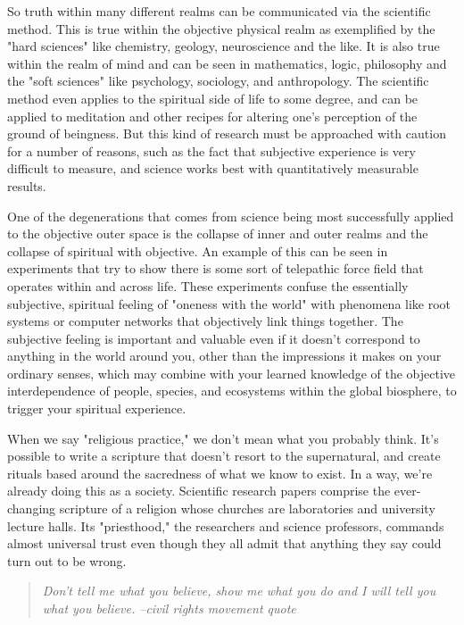 \documentclass[ebook,12pt,openany,twoside]{memoir}
\begin{document}
So truth within many different realms can be communicated via the scientific
method. This is true within the objective physical realm as exemplified by the
"hard sciences" like chemistry, geology, neuroscience and the like. It is also
true within the realm of mind and can be seen in mathematics, logic, philosophy
and the "soft sciences" like psychology, sociology, and anthropology. The
scientific method even applies to the spiritual side of life to some degree,
and can be applied to meditation and other recipes for altering one's
perception of the ground of beingness. But this kind of research must be
approached with caution for a number of reasons, such as the fact that
subjective experience is very difficult to measure, and science works best with
quantitatively measurable results.

One of the degenerations that comes from science being most successfully
applied to the objective outer space is the collapse of inner and outer realms
and the collapse of spiritual with objective. An example of this can be seen in
experiments that try to show there is some sort of telepathic force field that
operates within and across life. These experiments confuse the essentially
subjective, spiritual feeling of "oneness with the world" with phenomena like
root systems or computer networks that objectively link things together. The
subjective feeling is important and valuable even if it doesn't correspond to
anything in the world around you, other than the impressions it makes on your
ordinary senses, which may combine with your learned knowledge of the objective
interdependence of people, species, and ecosystems within the global biosphere,
to trigger your spiritual experience.

When we say "religious practice," we don't mean what you probably think. It's
possible to write a scripture that doesn't resort to the supernatural, and
create rituals based around the sacredness of what we know to exist. In a way,
we're already doing this as a society. Scientific research papers comprise the
ever-changing scripture of a religion whose churches are laboratories and
university lecture halls. Its "priesthood," the researchers and science
professors, commands almost universal trust even though they all admit that
anything they say could turn out to be wrong.


\begin{quote}
\em
  Don't tell me what you believe, show me what you do and I will tell you what you believe. --civil rights movement quote
\end{quote}


\newpage
\tableofcontents
\end{document}
